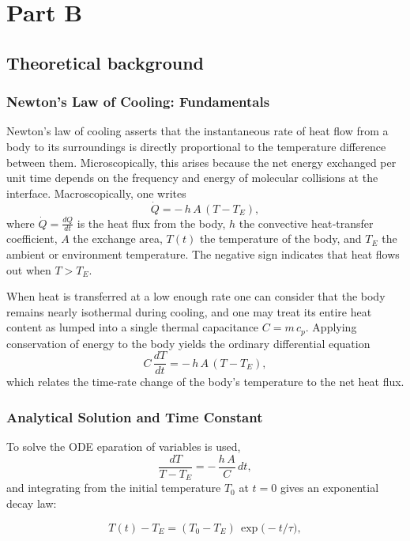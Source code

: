 \documentclass[12pt,a4paper]{report}
\begin{document}
\tableofcontents

\chapter{Part B}
\section{Theoretical background}


\subsection{Newton’s Law of Cooling: Fundamentals}
Newton’s law of cooling asserts that the instantaneous rate of heat flow from a body to its surroundings is directly proportional to the temperature difference between them. Microscopically, this arises because the net energy exchanged per unit time depends on the frequency and energy of molecular collisions at the interface. Macroscopically, one writes
\[
\dot{Q} = -\,h\,A\,(T - T_E),
\]
where $\dot{Q} = \frac{dQ}{dt}$ is the heat flux from the body, $h$ the convective heat‐transfer coefficient, $A$ the exchange area, $T(t)$ the temperature of the body, and $T_E$ the ambient or environment temperature. The negative sign indicates that heat flows out when $T>T_E$.

 When heat is transferred at a low enough rate one can consider that the body remains nearly isothermal during cooling, and one may treat its entire heat content as lumped into a single thermal capacitance $C=m\,c_p$. Applying conservation of energy to the body yields the ordinary differential equation
\[
C\,\frac{dT}{dt} = -\,h\,A\,(T - T_E),
\]
which relates the time‐rate change of the body’s temperature to the net heat flux.

\subsection{Analytical Solution and Time Constant}
To solve the ODE eparation of variables is used,
\[
\frac{dT}{T - T_E} = -\,\frac{h\,A}{C}\,dt,
\]
and integrating from the initial temperature $T_0$ at $t=0$ gives an exponential decay law:

\begin{equation} \label{T_v_t_exponential}
    T(t) - T_E = (T_0 - T_E)\,\exp\!\bigl(-t/\tau\bigr),
\end{equation}
\end{document}
